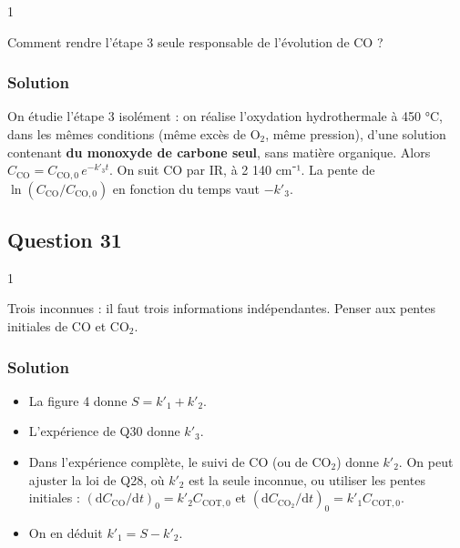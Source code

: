 \documentclass[11pt,a4paper]{article}
\providecommand{\tightlist}{\setlength{\itemsep}{0pt}\setlength{\parskip}{0pt}}
\begin{document}
\begin{indication}{1}

Comment rendre l'étape 3 seule responsable de l'évolution de CO ?

\end{indication}

\hypertarget{solution-29}{%
\subsubsection{Solution}\label{solution-29}}

On étudie l'étape 3 isolément : on réalise l'oxydation hydrothermale à 450 °C, dans les mêmes conditions (même excès de O\(_2\), même pression), d'une solution contenant \textbf{du monoxyde de carbone seul}, sans matière organique. Alors \(C_{\mathrm{CO}}=C_{\mathrm{CO},0}\,e^{-k'_3t}\). On suit CO par IR, à 2 140 cm⁻¹. La pente de \(\ln(C_{\mathrm{CO}}/C_{\mathrm{CO},0})\) en fonction du temps vaut \(-k'_3\).

\hypertarget{question-31}{%
\subsection{Question 31}\label{question-31}}

\begin{indication}{1}

Trois inconnues : il faut trois informations indépendantes. Penser aux pentes initiales de CO et CO\(_2\).

\end{indication}

\hypertarget{solution-30}{%
\subsubsection{Solution}\label{solution-30}}

\begin{itemize}
\tightlist
\item
  La figure 4 donne \(S=k'_1+k'_2\).
\item
  L'expérience de Q30 donne \(k'_3\).
\item
  Dans l'expérience complète, le suivi de CO (ou de CO\(_2\)) donne \(k'_2\). On peut ajuster la loi de Q28, où \(k'_2\) est la seule inconnue, ou utiliser les pentes initiales : \((\mathrm{d}C_{\mathrm{CO}}/\mathrm{d}t)_0=k'_2C_{\mathrm{COT},0}\) et \((\mathrm{d}C_{\mathrm{CO_2}}/\mathrm{d}t)_0=k'_1C_{\mathrm{COT},0}\).
\item
  On en déduit \(k'_1=S-k'_2\).
\end{itemize}
\end{document}
